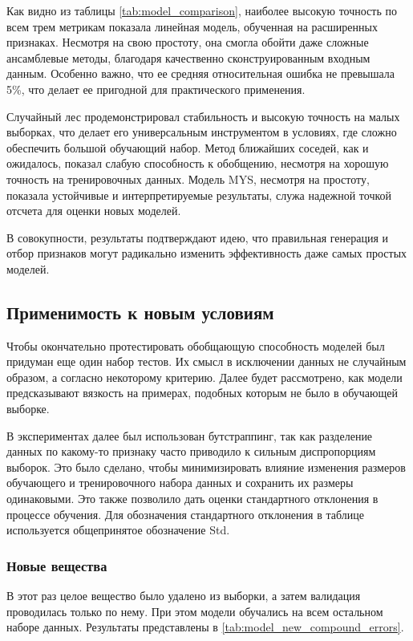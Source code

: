 \documentclass[a4paper,12pt]{article}
\begin{document}
    
    Как видно из таблицы \autoref{tab:model_comparison}, наиболее высокую точность по всем трем метрикам показала линейная модель, обученная на расширенных признаках. Несмотря на свою простоту, она смогла обойти даже сложные ансамблевые методы, благодаря качественно сконструированным входным данным. Особенно важно, что ее средняя относительная ошибка не превышала 5\%, что делает ее пригодной для практического применения.
    
    Случайный лес продемонстрировал стабильность и высокую точность на малых выборках, что делает его универсальным инструментом в условиях, где сложно обеспечить большой обучающий набор. Метод ближайших соседей, как и ожидалось, показал слабую способность к обобщению, несмотря на хорошую точность на тренировочных данных. Модель MYS, несмотря на простоту, показала устойчивые и интерпретируемые результаты, служа надежной точкой отсчета для оценки новых моделей.
    
    В совокупности, результаты подтверждают идею, что правильная генерация и отбор признаков могут радикально изменить эффективность даже самых простых моделей.

  \subsection{Применимость к новым условиям}

    Чтобы окончательно протестировать обобщающую способность моделей был придуман еще один набор тестов. Их смысл в исключении данных не случайным образом, а согласно некоторому критерию. Далее будет рассмотрено, как модели предсказывают вязкость на примерах, подобных которым не было в обучающей выборке. 

    В экспериментах далее был использован бутстраппинг, так как разделение данных по какому-то признаку часто приводило к сильным диспропорциям выборок. Это было сделано, чтобы минимизировать влияние изменения размеров обучающего и тренировочного набора данных и сохранить их размеры одинаковыми. Это также позволило дать оценки стандартного отклонения в процессе обучения. Для обозначения стандартного отклонения в таблице используется общепринятое обозначение Std.

    \subsubsection{Новые вещества}

      В этот раз целое вещество было удалено из выборки, а затем валидация проводилась только по нему. При этом модели обучались на всем остальном наборе данных. Результаты представлены в \autoref{tab:model_new_compound_errors}.
\end{document}
